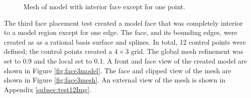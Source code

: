 \documentclass[a4paper, 12pt]{article}
\begin{document}
\begin{figure}[H]
  \centering
  \caption{Mesh of model with interior face except for one point.}
  \label{fig:face2mesh}
\end{figure}

The third face placement test created a model face that was completely 
interior to a model region except for one edge.
The face, and its bounding edges,  were created as 
as a rational basis surface and splines. In total, 12 control points were 
defined; the control points created a $4\times3$
grid. The global mesh refinement was set to 0.9 and the local set to 0.1. 
A front and face view of the created model are shown in Figure \ref{fig:face3model}.
The face and clipped view of the mesh are shown in Figure \ref{fig:face3mesh}.
An external view of the mesh is shown in Appendix \ref{subsec:test12Img}.
\end{document}
